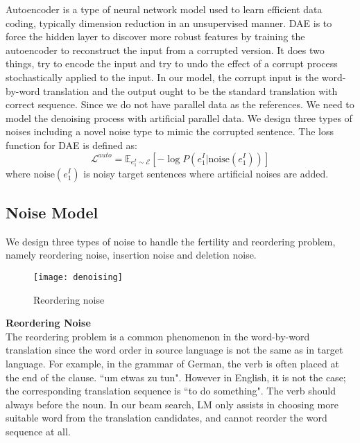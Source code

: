 	Autoencoder is a type of neural network model used to learn efficient data coding, typically dimension reduction in an unsupervised manner. DAE is to force the hidden layer to discover more robust features by training the autoencoder to reconstruct the input from a corrupted version. It does two things, try to encode the input and try to undo the effect of a corrupt process stochastically applied to the input. In our model, the corrupt input is the word-by-word translation and the output ought to be the standard translation with correct sequence. Since we do not have parallel data as the references. We need to model the denoising process with artificial parallel data. We design three types of noises including a novel noise type to mimic the corrupted sentence. The loss function for DAE is defined as: 
	\[ \mathcal{L}^{auto} = \mathbb{E}_{e_1^I \sim \mathcal{E}}[-\log P(e_1^I| \text{noise}(e_1^I))] \]
	where $\text{noise}(e_1^I)$ is noisy target sentences where artificial noises are added.

	
\subsection{Noise Model}
We design three types of noise to handle the fertility and reordering problem, namely reordering noise, insertion noise and deletion noise. 


	\begin{figure}[h]
	\texttt{[image: denoising]}
	\caption{ Reordering noise}
	\centering
\end{figure}
	\textbf{Reordering Noise}\\

	The reordering problem is a common phenomenon in the word-by-word translation since the word order in source language is not the same as in target language. 
	For example, in  the grammar of German, the verb is often placed at the end of the clause. 
	``um etwas zu tun". However in English, it is not the case; the corresponding translation sequence is ``to do something". The verb should always before the noun.
	In our beam search, LM only assists in choosing  more suitable word from the translation candidates, and cannot reorder the word sequence at all.
	
